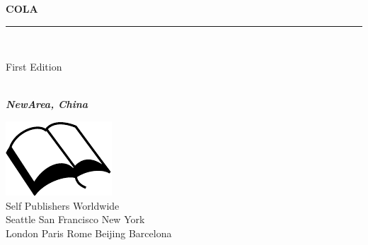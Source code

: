 \documentclass{book}
\makeatletter
\newcommand{\booksubtitle}{computational oriented linear algebra}
\newcommand{\authorsubtitle}{NewArea, China}
\newcommand{\bookauthor}{\@author}
\makeatother
\begin{document}
\begin{titlepage}
    \begin{flushleft}

        \textbf{\fontsize{48}{54}\selectfont COLA\\}

        \par\noindent\rule{\textwidth}{4pt}\\


        \begin{flushright}
            \Large First Edition
        \end{flushright}

        \vspace{\fill}

        \textbf{\large \bookauthor}\\[3.5pt]
        \textbf{\large \textit{\authorsubtitle}}

        \vspace{\fill}

        \begin{center}
            \includegraphics{booksvg.pdf}\\[4pt]
            \small{Self Publishers Worldwide\\
                Seattle San Francisco New York\\
                London Paris Rome Beijing Barcelona}
        \end{center}

    \end{flushleft}
\end{titlepage}
\restoregeometry
\end{document}
